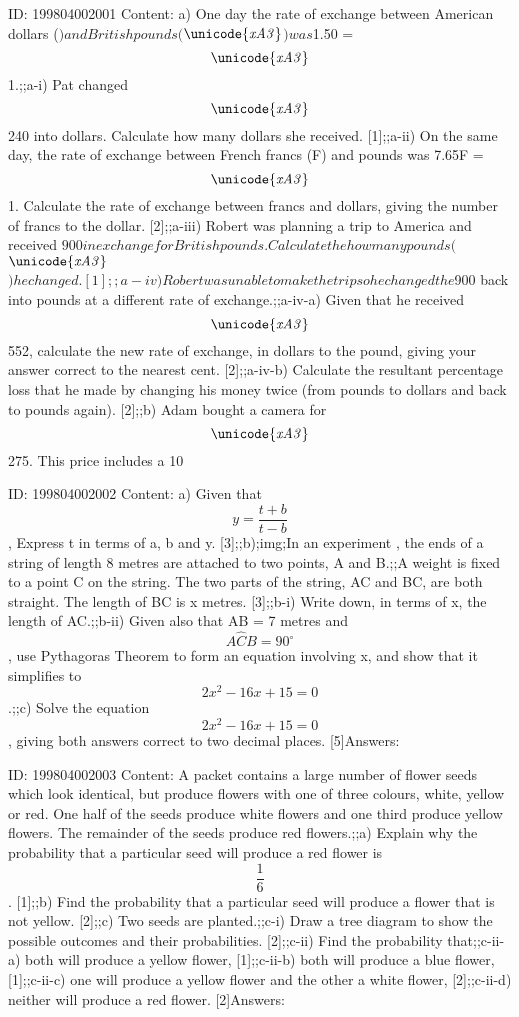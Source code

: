 \documentclass{article}
\begin{document}
ID: 199804002001
Content:
a) One day the rate of exchange between American dollars ($) and British pounds ($$\it\unicode{xA3}$$) was $1.50 = $$\it\unicode{xA3}$$1.;;a-i) Pat changed $$\it\unicode{xA3}$$240 into dollars. Calculate how many dollars she received. [1];;a-ii) On the same day, the rate of exchange between French francs (F) and pounds was 7.65F = $$\it\unicode{xA3}$$1. Calculate the rate of exchange between francs and dollars, giving the number of francs to the dollar. [2];;a-iii) Robert was planning a trip to America and received $900 in exchange for British pounds. Calculate the how many pounds ($$\it\unicode{xA3}$$) he changed. [1];;a-iv) Robert was unable to make the trip so he changed the $900 back into pounds at a different rate of exchange.;;a-iv-a) Given that he received $$\it\unicode{xA3}$$552, calculate the new rate of exchange, in dollars to the pound, giving your answer correct to the nearest cent. [2];;a-iv-b) Calculate the resultant percentage loss that he made by changing his money twice (from pounds to dollars and back to pounds again). [2];;b) Adam bought a camera for $$\it\unicode{xA3}$$275. This price includes a 10%

ID: 199804002002
Content:
a) Given that $$y = \frac{t+b}{t-b}$$, Express t in terms of a, b and y. [3];;b);img;In an experiment , the ends of a string of length 8 metres are attached to two points, A and B.;;A weight is fixed to a point C on the string. The two parts of the string, AC and BC, are both straight. The length of BC is x metres. [3];;b-i) Write down, in terms of x, the length of AC.;;b-ii) Given also that AB = 7 metres and $$A \hat CB = 90^{\circ}$$, use Pythagoras Theorem to form an equation involving x, and show that it simplifies to $$2x^2 - 16x + 15 = 0$$.;;c) Solve the equation $$2x^2 - 16x + 15 = 0$$, giving both answers correct to two decimal places. [5]Answers:

ID: 199804002003
Content:
A packet contains a large number of flower seeds which look identical, but produce flowers with one of three colours, white, yellow or red. One half of the seeds produce white flowers and one third produce yellow flowers. The remainder of the seeds produce red flowers.;;a) Explain why the probability that a particular seed will produce a red flower is $$\frac{1}{6}$$. [1];;b) Find the probability that a particular seed will produce a flower that is not yellow. [2];;c) Two seeds are planted.;;c-i) Draw a tree diagram to show the possible outcomes and their probabilities. [2];;c-ii) Find the probability that;;c-ii-a) both will produce a yellow flower, [1];;c-ii-b) both will produce a blue flower, [1];;c-ii-c) one will produce a yellow flower and the other a white flower, [2];;c-ii-d) neither will produce a red flower. [2]Answers:
\end{document}
